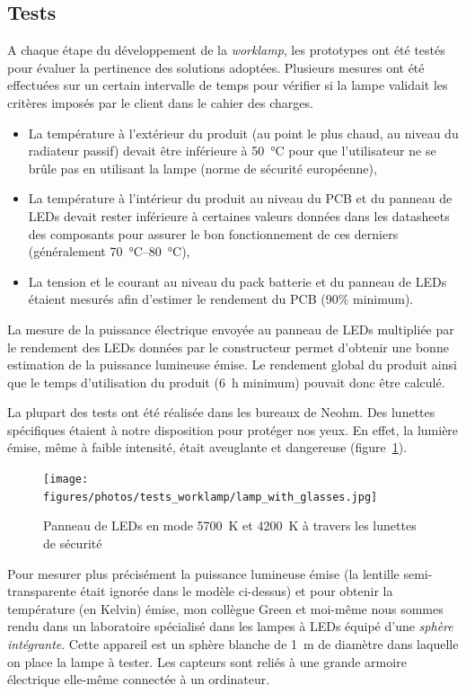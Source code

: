 \documentclass[a4paper, 12pt, sffamily]{report}
\begin{document}
\subsection{Tests}
A chaque étape du développement de la \emph{worklamp}, les prototypes ont été testés pour évaluer la pertinence des solutions adoptées. Plusieurs mesures ont été effectuées sur un certain intervalle de temps pour vérifier si la lampe validait les critères imposés par le client dans le cahier des charges.
\begin{itemize} %
\item La température à l'extérieur du produit (au point le plus chaud, au niveau du radiateur passif) devait être inférieure à \SI{50}{\celsius} pour que l'utilisateur ne se brûle pas en utilisant la lampe (norme de sécurité européenne),
\item La température à l'intérieur du produit au niveau du PCB et du panneau de LEDs devait rester inférieure à certaines valeurs données dans les datasheets des composants pour assurer le bon fonctionnement de ces derniers (généralement \SIrange{70}{80}{\celsius}),
\item La tension et le courant au niveau du pack batterie et du panneau de LEDs étaient mesurés afin d'estimer le rendement du PCB (90\% minimum).
\end{itemize}
La mesure de la puissance électrique envoyée au panneau de LEDs multipliée par le rendement des LEDs données par le constructeur permet d'obtenir une bonne estimation de la puissance lumineuse émise. Le rendement global du produit ainsi que le temps d'utilisation du produit (\SI{6}{\hour} minimum) pouvait donc être calculé.

La plupart des tests ont été réalisée dans les bureaux de Neohm. Des lunettes spécifiques étaient à notre disposition pour protéger nos yeux. En effet, la lumière émise, même à faible intensité, était aveuglante et dangereuse (figure~\ref{fig:lamp_with_glasses}).

\begin{figure}[h]
\centering
\texttt{[image: figures/photos/tests\_worklamp/lamp\_with\_glasses.jpg]}
\caption{Panneau de LEDs en mode \SI{5700}{\kelvin} et \SI{4200}{\kelvin} à travers les lunettes de sécurité}
\label{fig:lamp_with_glasses}
\end{figure}

Pour mesurer plus précisément la puissance lumineuse émise (la lentille semi-transparente était ignorée dans le modèle ci-dessus) et pour obtenir la température (en Kelvin) émise, mon collègue Green et moi-même nous sommes rendu dans un laboratoire spécialisé dans les lampes à LEDs équipé d'une \emph{sphère intégrante}. Cette appareil est un sphère blanche de \SI{1}{\meter} de diamètre dans laquelle on place la lampe à tester. Les capteurs sont reliés à une grande armoire électrique elle-même connectée à un ordinateur.
\end{document}
